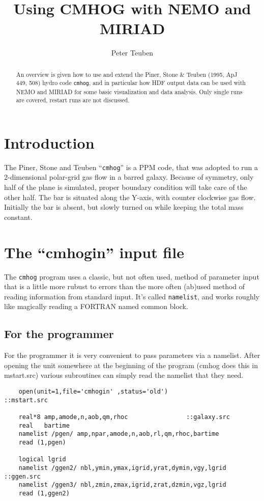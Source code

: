 \documentclass[11pt,epsf]{article}
\title{Using CMHOG with NEMO and MIRIAD}
\author{Peter Teuben}
\begin{document}
\maketitle


\begin{abstract}

An overview is given how to use and extend 
the Piner, Stone \& Teuben (1995, ApJ 449, 508) hydro code
{\tt cmhog}, and in particular how HDF output data can be used with
NEMO and MIRIAD for some basic visualization and data analysis.
Only single runs are covered, restart runs are not discussed.

\end{abstract}

\section{Introduction}

The Piner, Stone and Teuben ``{\tt cmhog}'' is a PPM code, 
that was adopted to run a 2-dimensional polar-grid gas flow in a 
barred galaxy. Because of symmetry, only half of the plane is
simulated, proper boundary condition will take care of the
other half. The bar is situated along the Y-axis, with 
counter clockwise gas flow. Initially the bar is absent, but
slowly turned on  while keeping the total mass constant.

\section{The ``cmhogin'' input file}

The {\tt cmhog} program uses a classic, but not often used, method of parameter input
that is a little more rubust to errors than the more often (ab)used method
of reading information from standard input. It's called {\tt namelist},
and works roughly like magically reading a FORTRAN named common block. 

\subsection{For the programmer}

For the programmer it is very convenient to pass parameters via a namelist.
After opening the unit somewhere at the beginning of the program
(cmhog does this in mstart.src) various subroutines can simply read
the namelist  that they need.

\begin{verbatim}
    open(unit=1,file='cmhogin' ,status='old')                     ::mstart.src

    real*8 amp,amode,n,aob,qm,rhoc				  ::galaxy.src
    real   bartime
    namelist /pgen/ amp,npar,amode,n,aob,rl,qm,rhoc,bartime       
    read (1,pgen)                                                 

    logical lgrid
    namelist /ggen2/ nbl,ymin,ymax,igrid,yrat,dymin,vgy,lgrid	  ::ggen.src
    namelist /ggen3/ nbl,zmin,zmax,igrid,zrat,dzmin,vgz,lgrid
    read (1,ggen2)




\end{verbatim}
\end{document}
